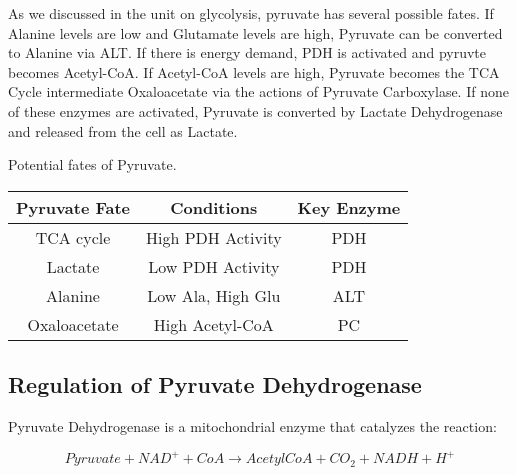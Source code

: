 \documentclass{tufte-handout}
\begin{document}
As we discussed in the unit on glycolysis, pyruvate has several possible fates.  If Alanine levels are low and Glutamate levels are high, Pyruvate can be converted to Alanine via ALT.  If there is energy demand, PDH is activated and pyruvte becomes Acetyl-CoA.  If Acetyl-CoA levels are high, Pyruvate becomes the TCA Cycle intermediate Oxaloacetate via the actions of Pyruvate Carboxylase.  If none of these enzymes are activated, Pyruvate is converted by Lactate Dehydrogenase and released from the cell as Lactate.

\begin{margintable}
\centering
\caption{Potential fates of Pyruvate.}
\label{tab:pyruvate-fates}
\begin{tabular}{ccc}
\hline
\textbf {Pyruvate Fate} & \textbf{Conditions}  & \textbf{Key Enzyme} \\
\hline
TCA cycle & High PDH Activity & PDH \\
Lactate & Low PDH Activity & PDH \\
Alanine & Low Ala, High Glu & ALT\\
Oxaloacetate & High Acetyl-CoA & PC \\
\hline
\end{tabular}
\end{margintable}


\subsection{Regulation of Pyruvate Dehydrogenase}

Pyruvate Dehydrogenase is a mitochondrial enzyme that catalyzes the reaction:

\begin{equation}
Pyruvate + NAD^+ + CoA \rightarrow AcetylCoA + CO_2 + NADH +H^+
\end{equation}
\end{document}
